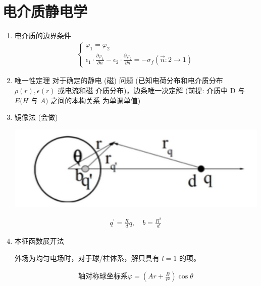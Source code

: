 \documentclass[../../note.tex]{subfiles}
\begin{document}
\section{电介质静电学}
\begin{enumerate}
	\item 电介质的边界条件
	\begin{align}\left\{
		\begin{array}{l}
		\varphi_1=\varphi_2 \\
		\epsilon_1 \cdot \frac{\partial \varphi_1}{\partial n}-\epsilon_2 \cdot \frac{\partial \varphi_2}{\partial n}=-\sigma_f(\vec{n}: 2 \rightarrow 1)
			\end{array}
		\right.
\end{align}
	\item 唯一性定理
	对于确定的静电 (磁) 问题 (已知电荷分布和电介质分布 $\rho(r), \epsilon(r)$ 或电流和磁 介质分布)，边条唯一决定解 (前提: 介质中 D 与 $E(H$ 与 $A)$ 之间的本构关系 为单调单值)
	\item 镜像法 (会做)
	
	\includegraphics[scale = 0.3]{../figures/fig1.png}
	
	 \begin{align}
	q^{\prime}=\frac{R}{d} q, \quad b=\frac{R^2}{d}
	\end{align}
	
	\item 本征函数展开法
	
	外场为均匀电场时，对于球/柱体系，解只具有 $l=1$ 的项。
	
	\begin{align}\text{轴对称球坐标系} \varphi=\left(A r+\frac{B}{r^2}\right) \cos \theta\end{align}
	

\end{enumerate}
\end{document}
